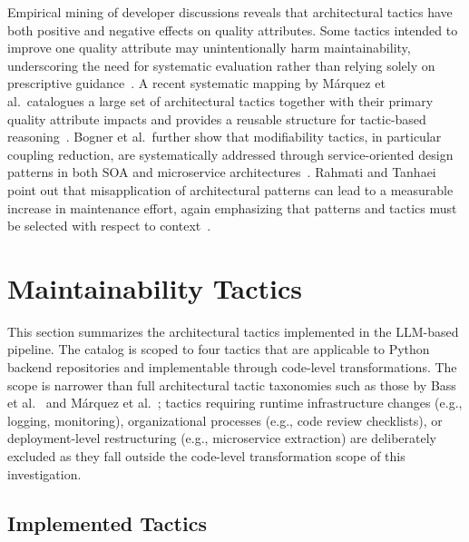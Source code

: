 Empirical mining of developer discussions reveals that architectural tactics have both positive and negative effects on quality attributes. Some tactics intended to improve one quality attribute may unintentionally harm maintainability, underscoring the need for systematic evaluation rather than relying solely on prescriptive guidance~\cite{bi2021mining}. A recent systematic mapping by M\'arquez et al.\ catalogues a large set of architectural tactics together with their primary quality attribute impacts and provides a reusable structure for tactic-based reasoning~\cite{marquez2022architectural}. Bogner et al.\ further show that modifiability tactics, in particular coupling reduction, are systematically addressed through service-oriented design patterns in both SOA and microservice architectures~\cite{bogner2019modifiability}. Rahmati and Tanhaei point out that misapplication of architectural patterns can lead to a measurable increase in maintenance effort, again emphasizing that patterns and tactics must be selected with respect to context~\cite{rahmati2021ensuring}.

\section{Maintainability Tactics}
\label{sec:maintainability_tactics}

This section summarizes the architectural tactics implemented in the LLM-based pipeline. The catalog is scoped to four tactics that are applicable to Python backend repositories and implementable through code-level transformations. The scope is narrower than full architectural tactic taxonomies such as those by Bass et al.~\cite{bass2021software} and M\'arquez et al.~\cite{marquez2022architectural}; tactics requiring runtime infrastructure changes (e.g., logging, monitoring), organizational processes (e.g., code review checklists), or deployment-level restructuring (e.g., microservice extraction) are deliberately excluded as they fall outside the code-level transformation scope of this investigation.

\subsection{Implemented Tactics}

